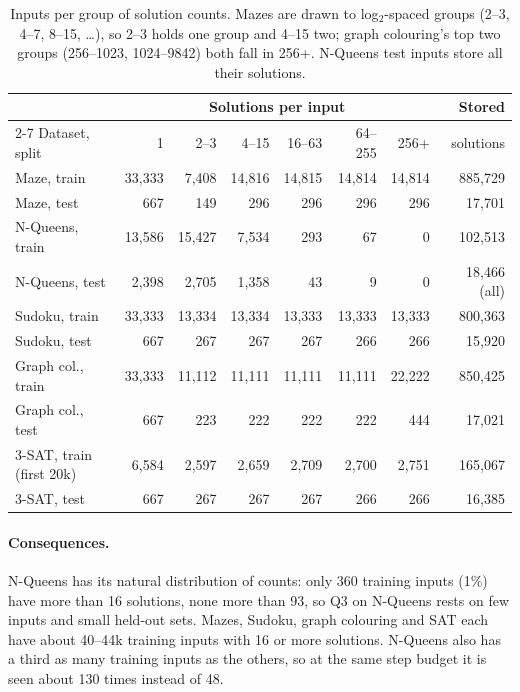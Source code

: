 \documentclass[11pt]{article}
\begin{document}
\begin{table}[h]
\centering\small
\begin{tabular}{@{}lrrrrrrr@{}}
\toprule
& \multicolumn{6}{c}{Solutions per input} & Stored \\
\cmidrule(lr){2-7}
Dataset, split & 1 & 2--3 & 4--15 & 16--63 & 64--255 & 256+ & solutions \\
\midrule
Maze, train & 33{,}333 & 7{,}408 & 14{,}816 & 14{,}815 & 14{,}814 & 14{,}814 & 885{,}729 \\
Maze, test & 667 & 149 & 296 & 296 & 296 & 296 & 17{,}701 \\
N-Queens, train & 13{,}586 & 15{,}427 & 7{,}534 & 293 & 67 & 0 & 102{,}513 \\
N-Queens, test & 2{,}398 & 2{,}705 & 1{,}358 & 43 & 9 & 0 & 18{,}466 (all) \\
Sudoku, train & 33{,}333 & 13{,}334 & 13{,}334 & 13{,}333 & 13{,}333 & 13{,}333 & 800{,}363 \\
Sudoku, test & 667 & 267 & 267 & 267 & 266 & 266 & 15{,}920 \\
Graph col., train & 33{,}333 & 11{,}112 & 11{,}111 & 11{,}111 & 11{,}111 & 22{,}222 & 850{,}425 \\
Graph col., test & 667 & 223 & 222 & 222 & 222 & 444 & 17{,}021 \\
3-SAT, train (first 20k) & 6{,}584 & 2{,}597 & 2{,}659 & 2{,}709 & 2{,}700 & 2{,}751 & 165{,}067 \\
3-SAT, test & 667 & 267 & 267 & 267 & 266 & 266 & 16{,}385 \\
\bottomrule
\end{tabular}
\caption{Inputs per group of solution counts. Mazes are drawn to log$_2$-spaced groups (2--3, 4--7, 8--15, \dots),
so 2--3 holds one group and 4--15 two; graph colouring's top two groups (256--1023, 1024--9842) both fall in 256+.
N-Queens test inputs store all their solutions.}
\label{tab:groups}
\end{table}

\paragraph{Consequences.} N-Queens has its natural distribution of counts: only 360 training inputs (1\%) have more
than 16 solutions, none more than 93, so Q3 on N-Queens rests on few inputs and small held-out sets. Mazes, Sudoku,
graph colouring and SAT each have about 40--44k training inputs with 16 or more solutions. N-Queens also has a third as many training inputs as
the others, so at the same step budget it is seen about 130 times instead of 48.
\end{document}
